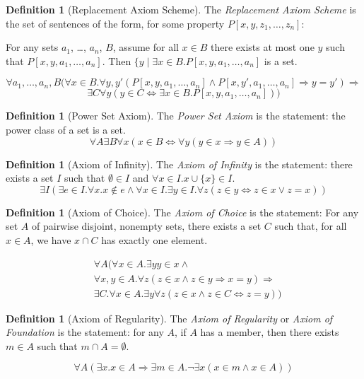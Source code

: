 \documentclass{book}
\theoremstyle{definition}
\newtheorem{df}[ax]{Definition}
\begin{document}
\begin{df}[Replacement Axiom Scheme]
The \emph{Replacement Axiom Scheme} is the set of sentences of the form, for some property $P[x,y,z_1, \ldots, z_n]$:

For any sets $a_1$, \ldots, $a_n$, $B$, assume for all $x \in B$ there exists at most one $y$ such that $P[x,y,a_1, \ldots, a_n]$. Then $\{ y \mid \exists x \in B. P[x,y,a_1, \ldots, a_n]$ is a set.

\[ \forall a_1, \ldots, a_n, B (\forall x \in B. \forall y,y'(P[x,y,a_1, \ldots, a_n] \wedge P[x,y',a_1, \ldots, a_n] \Rightarrow y = y') \Rightarrow \]
\[ \exists C \forall y (y \in C \Leftrightarrow \exists x \in B. P[x,y,a_1, \ldots, a_n])) \]
\end{df}

\begin{df}[Power Set Axiom]
The \emph{Power Set Axiom} is the statement: the power class of a set is a set.
\[ \forall A \exists B \forall x (x \in B \Leftrightarrow \forall y (y \in x \Rightarrow y \in A)) \]
\end{df}

\begin{df}[Axiom of Infinity]
The \emph{Axiom of Infinity} is the statement: there exists a set $I$ such that $\emptyset \in I$ and $\forall x \in I. x \cup \{x\} \in I$.
\[ \exists I (\exists e \in I. \forall x. x \notin e \wedge \forall x \in I. \exists y \in I. \forall z (z \in y \Leftrightarrow z \in x \vee z = x)) \]
\end{df}

\begin{df}[Axiom of Choice]
The \emph{Axiom of Choice} is the statement: 
For any set $A$ of pairwise disjoint, nonempty sets, there exists a set $C$ such that, for all $x \in A$, we have $x \cap C$ has exactly one element.

\begin{align*}
& \forall A ( \forall x \in A. \exists y y \in x \wedge \\
& \forall x,y \in A. \forall z(z \in x \wedge z \in y \Rightarrow x = y) \Rightarrow \\
& \exists C. \forall x \in A. \exists y \forall z (z \in x \wedge z \in C \Leftrightarrow z = y))
\end{align*}
\end{df}

\begin{df}[Axiom of Regularity]
The \emph{Axiom of Regularity} or \emph{Axiom of Foundation} is the statement:
for any $A$, if $A$ has a member, then there exists $m \in A$ such that $m \cap A = \emptyset$.

\[ \forall A (\exists x. x \in A \Rightarrow \exists m \in A. \neg \exists x (x \in m \wedge x \in A)) \]
\end{df}
\end{document}
